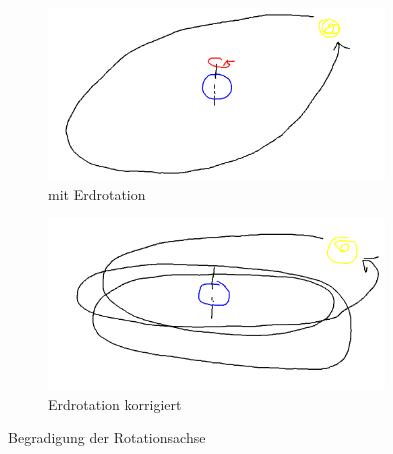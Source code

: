 \documentclass[
    paper=a4,
    DIV14,
    fontsize=12pt,
    pagesize=pdftex,
    toc=bibliographynumbered
]{scrartcl}
\numberwithin{figure}{section}
\numberwithin{equation}{section}
\numberwithin{table}{section}
\begin{document}
\begin{figure}[hbt]
    \centering
    \begin{subfigure}{0.48\textwidth}
        \centering
        \includegraphics[width=0.98\textwidth]{images/tmp/geomod1.png}
        \caption{mit Erdrotation}
    \end{subfigure}
    \begin{subfigure}{0.48\textwidth}
        \centering
        \includegraphics[width=0.98\textwidth]{images/tmp/geomod2.png}
        \caption{Erdrotation korrigiert}
    \end{subfigure}
    \caption{Begradigung der Rotationsachse}
    \label{fig:geomod}
\end{figure}
\end{document}
